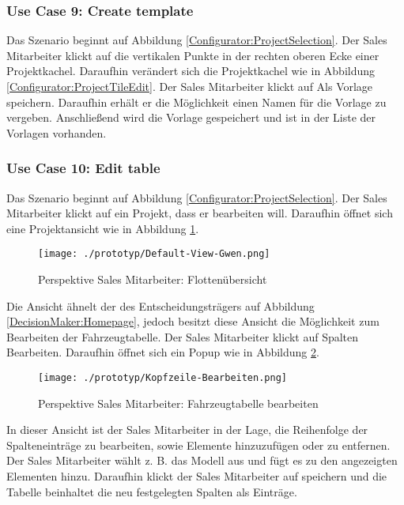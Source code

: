 \subsubsection{Use Case 9: Create template}

Das Szenario beginnt auf Abbildung \ref{Configurator:ProjectSelection}. Der Sales Mitarbeiter klickt auf die vertikalen Punkte in der rechten oberen Ecke einer Projektkachel. Daraufhin verändert sich die Projektkachel wie in Abbildung \ref{Configurator:ProjectTileEdit}. Der Sales Mitarbeiter klickt auf Als Vorlage speichern. Daraufhin erhält er die Möglichkeit einen Namen für die Vorlage zu vergeben. Anschließend wird die Vorlage gespeichert und ist in der Liste der Vorlagen vorhanden.

\subsubsection{Use Case 10: Edit table}

Das Szenario beginnt auf Abbildung \ref{Configurator:ProjectSelection}. Der Sales Mitarbeiter klickt auf ein Projekt, dass er bearbeiten will. Daraufhin öffnet sich eine Projektansicht wie in Abbildung \ref{Sales:VehicleList}. 

\begin{figure}[H]
  \centering
  \texttt{[image: ./prototyp/Default-View-Gwen.png]}
  \caption{Perspektive Sales Mitarbeiter: Flottenübersicht}
  \label{Sales:VehicleList}
\end{figure}

Die Ansicht ähnelt der des Entscheidungsträgers auf Abbildung \ref{DecisionMaker:Homepage}, jedoch besitzt diese Ansicht die Möglichkeit zum Bearbeiten der Fahrzeugtabelle. Der Sales Mitarbeiter klickt auf Spalten Bearbeiten. Daraufhin öffnet sich ein Popup wie in Abbildung \ref{Sales:EditTable}.

\begin{figure}[ht]
  \centering
  \texttt{[image: ./prototyp/Kopfzeile-Bearbeiten.png]}
  \caption{Perspektive Sales Mitarbeiter: Fahrzeugtabelle bearbeiten}
  \label{Sales:EditTable}
\end{figure}

In dieser Ansicht ist der Sales Mitarbeiter in der Lage, die Reihenfolge der Spalteneinträge zu bearbeiten, sowie Elemente hinzuzufügen oder zu entfernen. Der Sales Mitarbeiter wählt z. B. das Modell aus und fügt es zu den angezeigten Elementen hinzu. Daraufhin klickt der Sales Mitarbeiter auf speichern und die Tabelle beinhaltet die neu festgelegten Spalten als Einträge.

